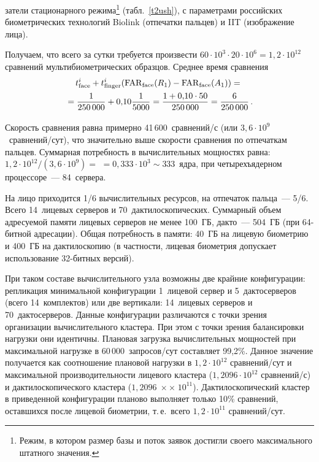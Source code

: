 \begin{multicols}{2}

\noindent     
затели стационарного режима\footnote{Режим, в котором размер базы и поток 
заявок достигли своего максимального штатного значения.} (табл.~\ref{t2ush}), с 
параметрами российских биометрических технологий Biolink (отпечатки пальцев) и 
IIT (изображение \mbox{лица}).  
      
     Получаем, что всего за сутки требуется про\-из\-вес\-ти $60\cdot 10^3\cdot 20\cdot 10^6 
=1{,}2\cdot 10^{12}$ сравнений мультибиометрических образцов. Среднее время 
сравнения 
     \begin{multline*}
     t^i_{\mathrm{face}} +t^i_{\mathrm{finger}} 
(\mathrm{FAR}_{\mathrm{face}}(R_1)-\mathrm{FAR}_{\mathrm{face}}(A_1)) ={}\\
{}=
     \displaystyle\frac{\displaystyle 1\mathstrut}{\displaystyle 250\,000\mathstrut}+0{,}10\displaystyle\frac{\displaystyle 1\mathstrut}{\displaystyle 5000\mathstrut}=\displaystyle\frac{\displaystyle 1+0{,}10\cdot 
50\mathstrut}{\displaystyle 250\,000\mathstrut}=\displaystyle\frac{\displaystyle 6\mathstrut}{\displaystyle 250\,000\mathstrut}\,.
     \end{multline*}
     
     Скорость сравнения равна примерно 41\,600~сравнений/с (или $3{,}6\cdot 
10^9$~срав\-не\-ний/сут), %
что значительно выше скорости сравнения по %
отпечаткам пальцев. 
Суммарная потребность в вы\-чис\-ли\-тель\-ных мощностях равна: $1{,}2\cdot 
10^{12}/(3{,}6\cdot 10^9)=$ 
$= 0{,}333\cdot 10^3\sim 333$~ядра, при четырехъядерном процессоре~--- 
84~сервера.
     
     На лицо приходится 1/6 вычислительных ресурсов, на отпечаток пальца~--- 5/6. 
Всего 14~лицевых серверов и 70~дактилоскопических. Суммарный объем адресуемой 
памяти лицевых серверов не менее 100~ГБ, дакто~--- 504~ГБ (при 64-битной 
адресации). Общая потребность в памяти: 40~ГБ на лицевую биометрию и 400~ГБ на 
дактилоскопию (в частности, лицевая биометрия допускает использование 32-бит\-ных 
версий). 
     
     При таком составе вычислительного узла возможны две крайние конфигурации: 
репликация минимальной конфигурации 1~лицевой сервер и 5~дактосерверов (всего 
14~комплектов) или две вертикали: 14~лицевых серверов и 70~дактосерверов. Данные 
конфигурации различаются с точки зрения организации вычислительного кластера. 
При этом с точки зрения балансировки нагрузки они идентичны. Плановая загрузка 
вычислительных мощностей при максимальной нагрузке в 60\,000~за\-про\-сов/сут 
составляет 99,2\%. Данное значение получается как соотношение плановой нагрузки в 
$1{,}2\cdot 10^{12}$ сравнений/сут и максимальной производительности лицевого 
кластера ($1{,}2096\cdot 10^{12}$ сравнений/с) и дактилоскопического кластера 
($1{,}2096\;\times$\linebreak $\times\;10^{11}$). Дактилоскопический кластер в приведенной конфигурации 
планово выполняет только 10\% сравнений, оставшихся после лицевой био\-мет\-рии, 
т.\,е.\ всего $1{,}2\cdot 10^{11}$ сравнений/сут.
     

\end{multicols}
